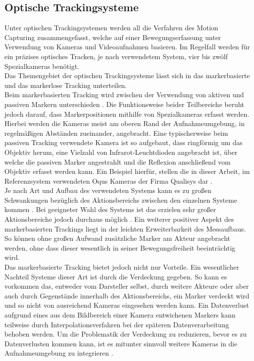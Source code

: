 \subsection{Optische Trackingsysteme}
Unter optischen Trackingsystemen werden all die Verfahren des Motion Capturing zusammengefasst, welche auf einer Bewegungserfassung unter Verwendung von Kameras und Videoaufnahmen basieren.
Im Regelfall werden für ein präzises optisches Tracken, je nach verwendetem System, vier bis zwölf Spezialkameras benötigt.\cite{optsys1}
\\Das Themengebiet der optischen Trackingsysteme lässt sich in das markerbasierte und das markerlose Tracking unterteilen.
\\Beim markerbasierten Tracking wird zwischen der Verwendung von aktiven und passiven Markern unterschieden \cite{P25}. Die Funktionsweise beider Teilbereiche beruht jedoch darauf, dass Markerpositionen mithilfe von Spezialkameras erfasst werden. Hierbei werden die Kameras meist am oberen Rand der Aufnahmeumgebung, in regelmäßigen Abständen zueinander, angebracht.
Eine typischerweise beim passiven Tracking verwendete Kamera ist so aufgebaut, dass ringförmig um das Objektiv herum, eine Vielzahl von Infrarot-Leuchtdioden angebracht ist, über welche die passiven Marker angestrahlt und die Reflexion anschließend vom Objektiv erfasst werden kann. \cite{optsys2}
Ein Beispiel hierfür, stellen die in dieser Arbeit, im Referenzsystem verwendeten Oqus Kameras der Firma Qualisys dar \cite{oqus}.
\\Je nach Art und Aufbau des verwendeten Systems kann es zu großen Schwankungen bezüglich des Aktionsbereichs zwischen den einzelnen Systeme kommen \cite{P24}. Bei geeigneter Wahl des Systems ist das erzielen sehr großer Aktionsbereiche jedoch durchaus möglich \cite{P25}.
Ein weiterer positiver Aspekt des markerbasierten Trackings liegt in der leichten Erweiterbarkeit des Messaufbaus. So können ohne großen Aufwand zusätzliche Marker am Akteur angebracht werden, ohne dass dieser wesentlich in seiner Bewegungsfreiheit beeinträchtig wird. \cite{optsys2}
\\Das markerbasierte Tracking bietet jedoch nicht nur Vorteile. Ein wesentlicher Nachteil Systeme dieser Art ist durch die Verdeckung gegeben. So kann es vorkommen das, entweder vom Darsteller selbst, durch weitere Akteure oder aber auch durch Gegenstände innerhalb des Aktionsbereichs, ein Marker verdeckt wird und so nicht von ausreichend Kameras eingesehen werden kann. Ein Datenverlust aufgrund eines aus dem Bildbereich einer Kamera entwichenen Markers kann teilweise durch Interpolationsverfahren bei der späteren Datenverarbeitung behoben werden. \cite{optsys2} Um die Problematik der Verdeckung zu reduzieren, bevor es zu Datenverlusten kommen kann, ist es mitunter sinnvoll weitere Kameras in die Aufnahmeumgebung zu integrieren \cite{P25}.
